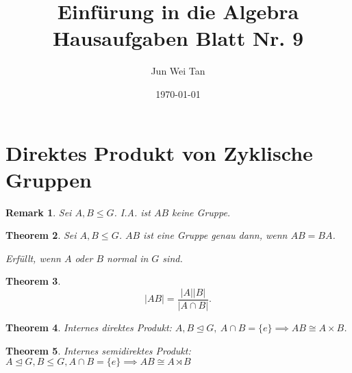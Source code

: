\documentclass[prb,12pt]{revtex4-2}
\newtheorem{Theorem}{Theorem}
\newtheorem{Remark}[Theorem]{Remark}
\theoremstyle{definition}
\theoremstyle{definition}
\begin{document}
	\title{Einf\"{u}rung in die Algebra Hausaufgaben Blatt Nr. 9}
	\author{Jun Wei Tan}
	\date{\today}
	\maketitle
	\section{Direktes Produkt von Zyklische Gruppen}
	\begin{Remark}
		Sei $A,B\le G$. I.A. ist $AB$ keine Gruppe.
	\end{Remark}
	\begin{Theorem}
		Sei  $A,B\le G$. $AB$ ist eine Gruppe genau dann, wenn $AB=BA$.

		Erfüllt, wenn $A$ oder $B$ normal in $G$ sind.
	\end{Theorem}
	\begin{Theorem}
		\[
		|AB|=\frac{|A| |B|}{|A\cap B|}
		.\] 
	\end{Theorem}
	\begin{Theorem}
		Internes direktes Produkt: $A,B\trianglelefteq G,~A\cap B=\{e\}\implies AB\cong A\times B $.
	\end{Theorem}
	\begin{Theorem}
		Internes semidirektes Produkt: $A\trianglelefteq G, B\le G,A\cap B=\{e\} \implies AB\cong A\rtimes B$
	\end{Theorem}
	
\end{document}
